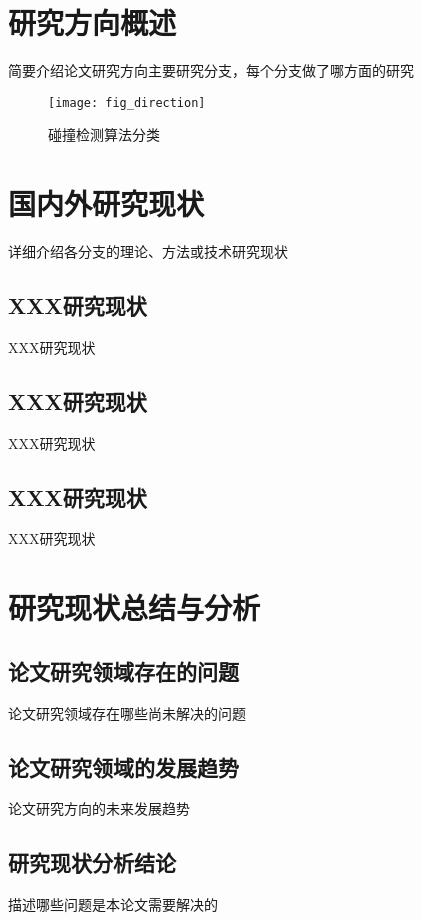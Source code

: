 \section{研究方向概述}
简要介绍论文研究方向主要研究分支，每个分支做了哪方面的研究

\begin{figure}[h]
	\centering
	\texttt{[image: fig\_direction]}
	\caption{碰撞检测算法分类}
\end{figure}

\section{国内外研究现状}
详细介绍各分支的理论、方法或技术研究现状

\subsection{XXX研究现状}
XXX研究现状
\subsection{XXX研究现状}
XXX研究现状
\subsection{XXX研究现状}
XXX研究现状
\section{研究现状总结与分析}
\subsection{论文研究领域存在的问题}
论文研究领域存在哪些尚未解决的问题   
\subsection{论文研究领域的发展趋势}
论文研究方向的未来发展趋势
\subsection{研究现状分析结论}
描述哪些问题是本论文需要解决的
